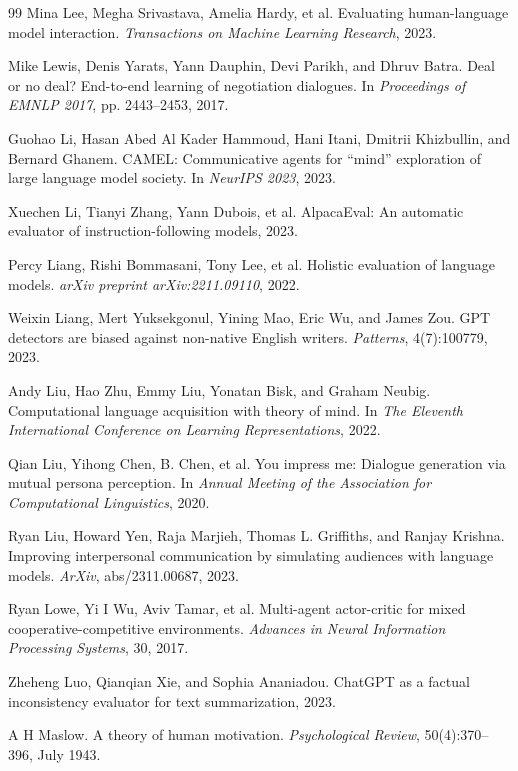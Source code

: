 \documentclass[11pt,a4paper]{article}
\begin{document}
\begin{thebibliography}{99}
Mina Lee, Megha Srivastava, Amelia Hardy, et al. Evaluating human-language model interaction. \textit{Transactions on Machine Learning Research}, 2023.

Mike Lewis, Denis Yarats, Yann Dauphin, Devi Parikh, and Dhruv Batra. Deal or no deal? End-to-end learning of negotiation dialogues. In \textit{Proceedings of EMNLP 2017}, pp. 2443--2453, 2017.

Guohao Li, Hasan Abed Al Kader Hammoud, Hani Itani, Dmitrii Khizbullin, and Bernard Ghanem. CAMEL: Communicative agents for ``mind'' exploration of large language model society. In \textit{NeurIPS 2023}, 2023.

Xuechen Li, Tianyi Zhang, Yann Dubois, et al. AlpacaEval: An automatic evaluator of instruction-following models, 2023.

Percy Liang, Rishi Bommasani, Tony Lee, et al. Holistic evaluation of language models. \textit{arXiv preprint arXiv:2211.09110}, 2022.

Weixin Liang, Mert Yuksekgonul, Yining Mao, Eric Wu, and James Zou. GPT detectors are biased against non-native English writers. \textit{Patterns}, 4(7):100779, 2023.

Andy Liu, Hao Zhu, Emmy Liu, Yonatan Bisk, and Graham Neubig. Computational language acquisition with theory of mind. In \textit{The Eleventh International Conference on Learning Representations}, 2022.

Qian Liu, Yihong Chen, B. Chen, et al. You impress me: Dialogue generation via mutual persona perception. In \textit{Annual Meeting of the Association for Computational Linguistics}, 2020.

Ryan Liu, Howard Yen, Raja Marjieh, Thomas L. Griffiths, and Ranjay Krishna. Improving interpersonal communication by simulating audiences with language models. \textit{ArXiv}, abs/2311.00687, 2023.

Ryan Lowe, Yi I Wu, Aviv Tamar, et al. Multi-agent actor-critic for mixed cooperative-competitive environments. \textit{Advances in Neural Information Processing Systems}, 30, 2017.

Zheheng Luo, Qianqian Xie, and Sophia Ananiadou. ChatGPT as a factual inconsistency evaluator for text summarization, 2023.

A H Maslow. A theory of human motivation. \textit{Psychological Review}, 50(4):370--396, July 1943.


\end{thebibliography}
\end{document}
